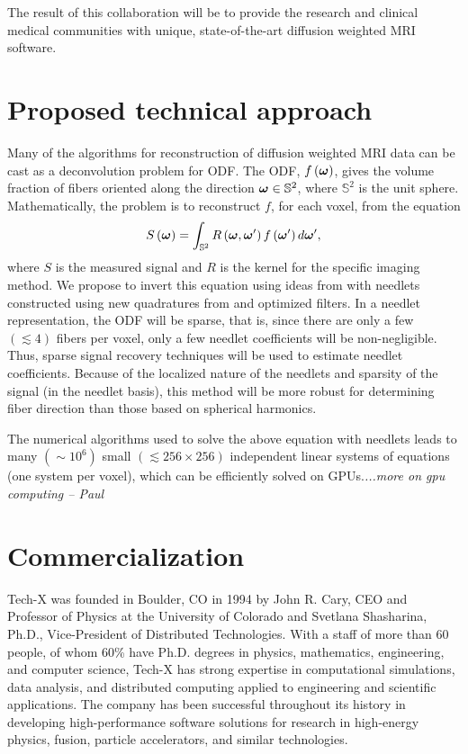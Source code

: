 \documentclass[10pt]{article}
\begin{document}
The result of this collaboration will be to provide the research and clinical
medical communities with unique, state-of-the-art diffusion weighted MRI
software.

\section*{Proposed technical approach}
Many of the algorithms for reconstruction of diffusion weighted MRI data can be
cast as a deconvolution problem for ODF\cite{JIA-VEM-2007}. The ODF, $f\left({\boldsymbol{\omega}}\right)$, gives the volume
fraction of fibers oriented along the direction ${\boldsymbol{\omega}}\in\mathbb{S}^2$, where
$\mathbb{S}^2$ is the unit sphere. Mathematically, the problem is to
reconstruct $f$, for each voxel, from the equation
\begin{equation*}
  S\left({\boldsymbol{\omega}}\right) = \int_{\mathbb{S}^2} R\left({\boldsymbol{\omega}},{\boldsymbol{\omega}}'\right)
  f\left({\boldsymbol{\omega}}'\right)d{\boldsymbol{\omega}}', 
\end{equation*}  
where $S$ is the measured signal and $R$ is the kernel for the specific imaging
method. We propose to invert this equation using ideas from
\cite{KE-NG-PI-2009} with needlets constructed using new quadratures from
\cite{AHR-BEY-2009} and optimized filters. In a needlet representation, the ODF
will be sparse, that is, since there are only a few $(\lesssim 4)$ fibers per
voxel, only a few needlet coefficients will be non-negligible. Thus, sparse
signal recovery techniques will be used to estimate needlet
coefficients. Because of the localized nature of the needlets and sparsity of
the signal (in the needlet basis), this method will be more robust for
determining fiber direction than those based on spherical harmonics.

The numerical algorithms used to solve the above equation with needlets leads to many $(\sim 10^6)$ small $(\lesssim 256\times256)$ independent linear systems of equations (one system per voxel), which can be efficiently solved on GPUs.\emph{...more on gpu computing -- Paul}

\section*{Commercialization}
Tech-X was founded in Boulder, CO in 1994 by John R. Cary, CEO and Professor of Physics at the University of Colorado and Svetlana Shasharina, Ph.D., Vice-President of Distributed Technologies. With a staff of more than 60 people, of whom 60\% have Ph.D. degrees in physics, mathematics, engineering, and computer science, Tech-X has strong expertise in computational simulations, data analysis, and distributed computing applied to engineering and scientific applications.  The company has been successful throughout its history in developing high-performance software solutions for research in high-energy physics, fusion, particle accelerators, and similar technologies.
\end{document}

